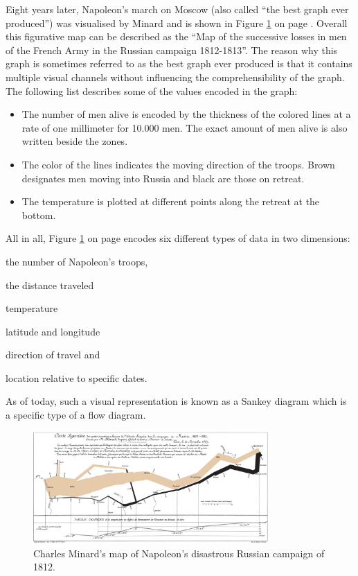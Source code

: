 Eight years later, Napoleon's march on Moscow (also called ``the best graph ever produced'') was visualised by Minard and is shown in Figure \ref{fig:minard2} on page \pageref{fig:minard2}. Overall this figurative map can be described as the ``Map of the successive losses in men of the French Army in the Russian campaign 1812-1813''. The reason why this graph is sometimes referred to as the best graph ever produced is that it contains multiple visual channels without influencing the comprehensibility of the graph. The following list describes some of the values encoded in the graph:
\begin{itemize}
\item The number of men alive is encoded by the thickness of the colored lines at a rate of one millimeter for 10.000 men. The exact amount of men alive is also written beside the zones.
\item The color of the lines indicates the moving direction of the troops. Brown designates men moving into Russia and black are those on retreat.
\item The temperature is plotted at different points along the retreat at the bottom.
\end{itemize}
All in all, Figure \ref{fig:minard2} on page \pageref{fig:minard2} encodes six different types of data in two dimensions:
\begin{enumerate*}[label={(\arabic*)}]
\item the number of Napoleon's troops,
\item the distance traveled
\item temperature
\item latitude and longitude
\item direction of travel and
\item location relative to specific dates.
\end{enumerate*}
As of today, such a visual representation is known as a Sankey diagram which is a specific type of a flow diagram.

\begin{figure}[!htb]
\centering
\includegraphics[width=0.8\textwidth,keepaspectratio]{images/history/minard2.png}
\caption[
    Charles Minard's map of Napoleon's disastrous Russian campaign of 1812., Urldate: 07.2016 \newline
\small\texttt{\url{https://upload.wikimedia.org/wikipedia/commons/2/29/Minard.png}}
]{Charles Minard's map of Napoleon's disastrous Russian campaign of 1812.}
\label{fig:minard2}
\end{figure}

